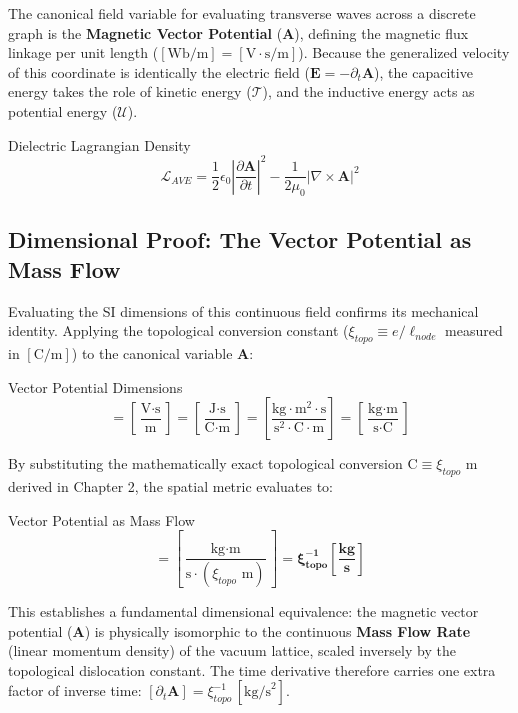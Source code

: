 The canonical field variable for evaluating transverse waves across a discrete graph is the \textbf{Magnetic Vector Potential} ($\mathbf{A}$), defining the magnetic flux linkage per unit length ($[\text{Wb/m}] = [\text{V}\cdot\text{s/m}]$). Because the generalized velocity of this coordinate is identically the electric field ($\mathbf{E} = -\partial_t \mathbf{A}$), the capacitive energy takes the role of kinetic energy ($\mathcal{T}$), and the inductive energy acts as potential energy ($\mathcal{U}$).
\begin{resultbox}{Dielectric Lagrangian Density}
\begin{equation}
    \mathcal{L}_{AVE} = \frac{1}{2} \epsilon_0 \left| \frac{\partial \mathbf{A}}{\partial t} \right|^2 - \frac{1}{2\mu_0} |\nabla \times \mathbf{A}|^2
\end{equation}
\end{resultbox}

\subsection{Dimensional Proof: The Vector Potential as Mass Flow}
Evaluating the SI dimensions of this continuous field confirms its mechanical identity. Applying the topological conversion constant ($\xi_{topo} \equiv e/\ell_{node}$ measured in $[\text{C/m}]$) to the canonical variable $\mathbf{A}$:
\begin{resultbox}{Vector Potential Dimensions}
\begin{equation}
    [\mathbf{A}] = \left[ \frac{\text{V} \cdot \text{s}}{\text{m}} \right] = \left[ \frac{\text{J} \cdot \text{s}}{\text{C} \cdot \text{m}} \right] = \left[ \frac{\text{kg} \cdot \text{m}^2 \cdot \text{s}}{\text{s}^2 \cdot \text{C} \cdot \text{m}} \right] = \left[ \frac{\text{kg} \cdot \text{m}}{\text{s} \cdot \text{C}} \right]
\end{equation}
\end{resultbox}
By substituting the mathematically exact topological conversion $\text{C} \equiv \xi_{topo} \text{ m}$ derived in Chapter 2, the spatial metric evaluates to:
\begin{resultbox}{Vector Potential as Mass Flow}
\begin{equation}
    [\mathbf{A}] = \left[ \frac{\text{kg} \cdot \text{m}}{\text{s} \cdot (\xi_{topo} \text{ m})} \right] = \mathbf{\xi_{topo}^{-1} \left[ \frac{\text{kg}}{\text{s}} \right]}
\end{equation}
\end{resultbox}
This establishes a fundamental dimensional equivalence: the magnetic vector potential ($\mathbf{A}$) is physically isomorphic to the continuous \textbf{Mass Flow Rate} (linear momentum density) of the vacuum lattice, scaled inversely by the topological dislocation constant. The time derivative therefore carries one extra factor of inverse time: $[\partial_t \mathbf{A}] = \xi_{topo}^{-1}\,[\text{kg/s}^2]$.

